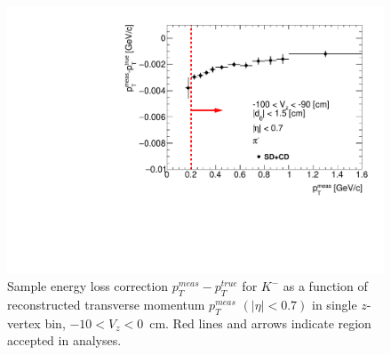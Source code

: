 \begin{figure}[hb]

\centering
 \includegraphics[width=0.9\linewidth,page=30]{graphics/energyLoss/energyLoss3D_OnePrtAlso.pdf}
 \caption[Sample energy loss correction for $K^-$ as a function of reconstructed transverse momentum $p_T^{meas}$.]{Sample energy loss correction $p_T^{meas}-p_T^{true}$ for $K^-$ as a function of reconstructed transverse momentum $p_T^{meas}$ $\left(|\eta|<0.7\right)$ in single $z$-vertex bin, $-10<V_z <0$~cm. Red lines and arrows indicate region accepted in analyses.}\label{fig:energyLossPrimaryK_minus_sample}

\end{figure}